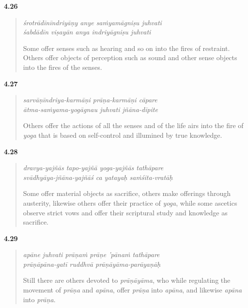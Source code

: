 \par\noindent\textbf{4.26}\par
\begin{verse}
\textit{śrotrādīnīndriyāṇy anye saṁyamāgniṣu juhvati} \\
\textit{śabdādīn viṣayān anya indriyāgniṣu juhvati}

\noindent Some offer senses such as hearing and so on into the fires of restraint. Others offer objects of perception such as sound and other sense objects into the fires of the senses.
\end{verse}
\par



\par\noindent\textbf{4.27}\par
\begin{verse}
\textit{sarvāṇīndriya-karmāṇi prāṇa-karmāṇi cāpare} \\
\textit{ātma-saṁyama-yogāgnau juhvati jñāna-dīpite}

\noindent Others offer the actions of all the senses and of the life airs into the fire of \textit{yoga} that is based on self-control and illumined by true knowledge.
\end{verse}
\par



\par\noindent\textbf{4.28}\par
\begin{verse}
\textit{dravya-yajñās tapo-yajñā yoga-yajñās tathāpare} \\
\textit{svādhyāya-jñāna-yajñāś ca yatayaḥ saṁśita-vratāḥ}

\noindent Some offer material objects as sacrifice, others make offerings through austerity, likewise others offer their practice of \textit{yoga}, while some ascetics observe strict vows and offer their scriptural study and knowledge as sacrifice.
\end{verse}
\par



\par\noindent\textbf{4.29}\par
\begin{verse}
\textit{apāne juhvati prāṇaṁ prāṇe ’pānaṁ tathāpare} \\
\textit{prāṇāpāna-gatī ruddhvā prāṇāyāma-parāyaṇāḥ}

\noindent Still there are others devoted to \textit{prāṇāyāma}, who while regulating the movement of \textit{prāṇa} and \textit{apāna}, offer \textit{prāṇa} into \textit{apāna}, and likewise \textit{apāna} into \textit{prāṇa}.
\end{verse}
\par



